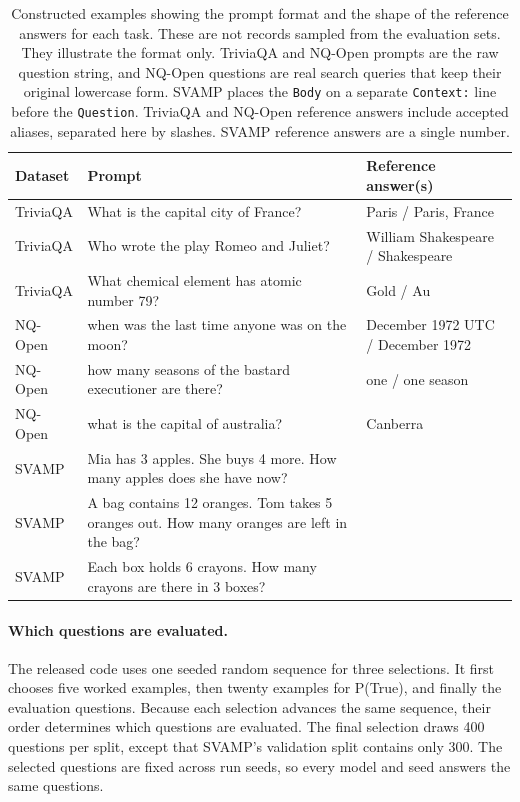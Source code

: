 \begin{table}[htb]
\centering
\small
\caption{Constructed examples showing the prompt format and the shape of the
  reference answers for each task. These are not records sampled from the
  evaluation sets. They illustrate the format only. TriviaQA and NQ-Open
  prompts are the raw question string, and NQ-Open questions are real search
  queries that keep their original lowercase form. SVAMP places the
  \texttt{Body} on a separate \texttt{Context:} line before the
  \texttt{Question}. TriviaQA and NQ-Open
  reference answers include accepted aliases, separated here by slashes.
  SVAMP reference answers are a single number.}
\label{tab:dataset-samples}
\begingroup
\setlength{\tabcolsep}{3pt}
\begin{tabular}{@{}p{1.45cm}>{\raggedright\arraybackslash}p{5.8cm}>{\raggedright\arraybackslash}p{2.6cm}@{}}
\toprule
Dataset & Prompt & \makecell[l]{Reference\\answer(s)} \\
\midrule
TriviaQA & What is the capital city of France?                        & Paris / Paris, France \\[4pt]
TriviaQA & Who wrote the play Romeo and Juliet?                       & William Shakespeare / Shakespeare \\[4pt]
TriviaQA & What chemical element has atomic number 79?                & Gold / Au \\
\midrule
NQ-Open  & when was the last time anyone was on the moon?             & 14 December 1972 UTC / December 1972 \\[4pt]
NQ-Open  & how many seasons of the bastard executioner are there?     & one / one season \\[4pt]
NQ-Open  & what is the capital of australia?                          & Canberra \\
\midrule
SVAMP    & Mia has 3 apples. She buys 4 more. How many apples does she have now?                              & 7  \\[4pt]
SVAMP    & A bag contains 12 oranges. Tom takes 5 oranges out. How many oranges are left in the bag?           & 7  \\[4pt]
SVAMP    & Each box holds 6 crayons. How many crayons are there in 3 boxes?                                    & 18 \\
\bottomrule
\end{tabular}
\endgroup
\end{table}

\paragraph{Which questions are evaluated.} The released code uses one seeded
random sequence for three selections. It first chooses five worked examples,
then twenty examples for P(True), and finally the evaluation questions. Because
each selection advances the same sequence, their order determines which
questions are evaluated. The final selection draws 400 questions per split,
except that SVAMP's validation split contains only 300. The selected questions
are fixed across run seeds, so every model and seed answers the same questions.

